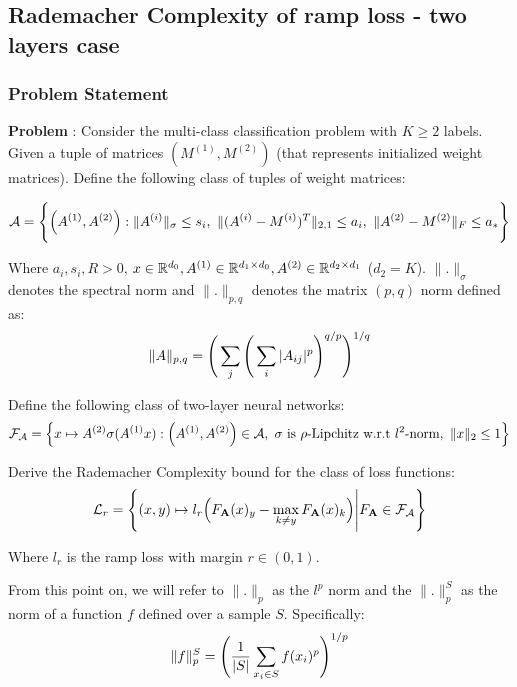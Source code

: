 \newpage
\subsection{Rademacher Complexity of ramp loss - two layers case}
\subsubsection{Problem Statement}
\textbf{Problem} : Consider the multi-class classification problem with $K \ge 2$ labels. Given a tuple of matrices $(M^{(1)}, M^{(2)})$ (that represents initialized weight matrices). Define the following class of tuples of weight matrices:

\begin{align*}
    \mathcal{A} = \Bigg\{ 
        \Big( 
            A^{(1)}, A^{(2)}
         \Big) : \|A^{(i)}\|_\sigma \le s_i, \ \| (A^{(i)} - M^{(i)})^T \|_{2, 1} \le a_i, \ \| A^{(2)} - M^{(2)} \|_F \le a_*
     \Bigg\}
\end{align*}

\noindent Where $a_i, s_i, R > 0$, $x\in \mathbb{R}^{d_0}, A^{(1)}\in\mathbb{R}^{d_1\times d_0}, A^{(2)}\in \mathbb{R}^{d_2\times d_1}$ ($d_2=K$). $\|.\|_\sigma$ denotes the spectral norm and $\|.\|_{p, q}$ denotes the matrix $(p, q)$ norm defined as:
\begin{align*}
    \|A\|_{p, q} = \Bigg( \sum_j\Bigg( \sum_{i}|A_{ij}|^p \Bigg)^{q/p} \Bigg)^{1/q}
\end{align*}    

\noindent Define the following class of two-layer neural networks:
\begin{align*}
    \mathcal{F}_\mathcal{A} = \Big\{ 
        x\mapsto A^{(2)}\sigma(A^{(1)}x) : \Big( A^{(1)}, A^{(2)} \Big)\in\mathcal{A}, \ \sigma \text{ is } \rho\text{-Lipchitz w.r.t } l^2\text{-norm}, \ \|x\|_2 \le 1
     \Big\}
\end{align*}

\noindent Derive the Rademacher Complexity bound for the class of loss functions:
\begin{align*}
    \mathcal{L}_r = \Bigg\{ 
        (x, y) \mapsto l_r\Big( 
            F_{\bf A}(x)_y - \max_{k\ne y}F_{\bf A}(x)_k
         \Big) \Bigg| F_{\bf A} \in \mathcal{F}_\mathcal{A}
     \Bigg\}
\end{align*}

\noindent Where $l_r$ is the ramp loss with margin $r\in(0,1)$.

\noindent\newline\color{red}
From this point on, we will refer to $\|.\|_p$ as the $l^p$ norm and the $\|.\|_p^S$ as the norm of a function $f$ defined over a sample $S$. Specifically:
\begin{align*}
    \|f\|_p^S = \Bigg( 
        \frac{1}{|S|}\sum_{x_i \in S} f(x_i) ^p
     \Bigg)^{1/p}
\end{align*}

